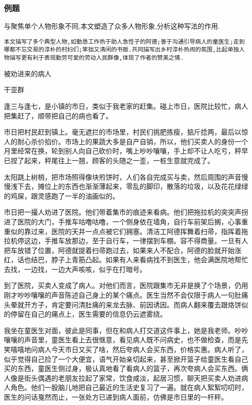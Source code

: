 \documentclass{ctexart}
\newcommand{\nm}{\normalsize}
\renewcommand{\\}{\par}
\begin{document}
\subsubsection{例题}
与聚焦单个人物形象不同,本文塑造了众多人物形象,分析这种写法的作用.\\
\texttt{本文描写了多个典型人物,如勤恳工作热于助人急性子的阿德;善于沟通引导病人的童医生;走到哪都不忘交易的淳朴的村妇们;笨拙又清闲的书贩.共同描写出乡村淳朴热闹的氛围,比起单独人物描写更有利于表现勤劳可爱的劳动人民群像,体现了作者的赞美之情.}\\
\nm \fangsong
\\\centerline{被劝进来的病人}   \\\centerline{干亚群}
\\逢三与逢七，是小镇的市日，类似于我老家的赶集。碰上市日，医院比较忙，病人把集赶了，顺带把自己的病也看了。
\\市日把村民赶到镇上。毫无遮拦的市场里，村民们挑肥拣瘦，掂斤捻两，最后以惊人的耐心杀价掐价。市场上的果蔬大多是自产自销，所以，他们买卖人的身份一个月里经常在换，轮到别人向自己砍价时，嘴上吵吵嚷嚷，手上却不让人吃亏，秤早已捏了起来，秤尾往上一翘，顾客的头随之一歪，一桩生意就完成了。
\\太阳跳上树梢，把市场照得像块煎饼时，人们各自完成买与卖，然后周围的声音慢慢浅下去，摊位上的东西也渐渐薄起来，零乱的脚印，散落的垃圾，以及花花绿绿的鸡屎，跟灵感跑了一半的油画似的。
\\市日把一撮人劝进了医院。他们带着集市的痕迹来看病。他们把拖拉机的突突声拐进了医院的大门，手推车咕噜咕噜，一个侧身依在墙角，自行车前架后搁，心事重重似的靠过来，医院的天井一点点被它们拥塞。清洁工阿德挥舞着扫帚，指挥着拖拉机停这边，手推车放那边，至于自行车，一律摆到车棚。容不得商量。一旦有人把车放错了位置，阿德就提着扫帚跑过去，如果来人不配合，阿德的脸就开始涨红，话也结巴，脖子上青筋凸起。如果有人来看病找不到医生，他会满医院地帮忙去找，一边找，一边大声咳咳，似乎在打暗号。　　
\\到了医院，买卖人变成了病人。对他们而言，医院跟集市无非是换了个场景，仍用刚才吵吵嚷嚷的声音陈述自己身上的某个痛点。医生当然不会仅限于病人一句肚痛头晕就开方子，肯定要问清肚痛的来龙去脉、前因诱因。而病人翻来覆去跟烙饼似的停留在自己的痛点上，医生需要的信息仍云遮雾绕。
\\我坐在童医生对面，彼此是同事，但在和病人打交道这件事上，她是我老师。吵吵嚷嚷的声音里，童医生看上去很惬意，看见病人既不问病史，也不做检查，而是先笑嘻嘻地问病人今天市日又买了啥，然后夸病人会买东西，价格实惠。病人听了，似乎觉得自己捡了一个大便宜，语气开始亲切起来，甚至掀开篮子给童医生看自己买的东西，童医生侧过身，极认真地看了看病人的篮子，再次夸病人会买东西。俩人像是街头偶遇的老朋友拉起了家常，饮食咸淡，起居习惯，聊天把买卖人劝进病人角色。他们一股脑儿地把自己最近的生活史复习了一遍。就在病人絮絮叨叨时，医生的问话戛然而止，一张处方已递到病人面前，仿佛是市日里的一杆秤。
\end{document}

